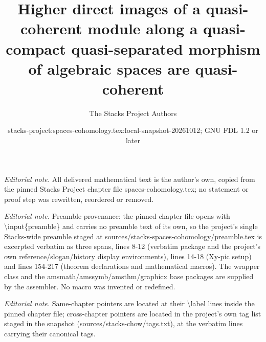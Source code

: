 \documentclass[10pt,a4paper]{amsart}
\title{Higher direct images of a quasi-coherent module along a quasi-compact quasi-separated morphism of algebraic spaces are quasi-coherent}
\author{The Stacks Project Authors}
\date{stacks-project:spaces-cohomology.tex:local-snapshot-20261012; GNU FDL 1.2 or later}
\theoremstyle{plain}
\theoremstyle{definition}
\theoremstyle{remark}
\numberwithin{equation}{subsection}
\begin{document}
\maketitle
\noindent\textit{Editorial note.} All delivered mathematical text is the author's own, copied from the pinned Stacks Project chapter file spaces-cohomology.tex; no statement or proof step was rewritten, reordered or removed.\par\medskip
\noindent\textit{Editorial note.} Preamble provenance: the pinned chapter file opens with \textbackslash{}input\{preamble\} and carries no preamble text of its own, so the project's single Stacks-wide preamble staged at sources/stacks-spaces-cohomology/preamble.tex is excerpted verbatim as three spans, lines 8-12 (verbatim package and the project's own reference/slogan/history display environments), lines 14-18 (Xy-pic setup) and lines 154-217 (theorem declarations and mathematical macros). The wrapper class and the amsmath/amssymb/amsthm/graphicx base packages are supplied by the assembler. No macro was invented or redefined.\par\medskip
\noindent\textit{Editorial note.} Same-chapter pointers are located at their \textbackslash{}label lines inside the pinned chapter file; cross-chapter pointers are located in the project's own tag list staged in the snapshot (sources/stacks-chow/tags.txt), at the verbatim lines carrying their canonical tags.\par\medskip
\end{document}
